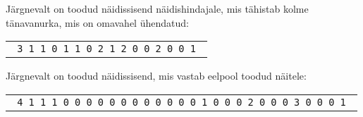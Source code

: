 \documentclass{boi2014}
\begin{document}
    Järgnevalt on toodud näidissisend näidishindajale, mis tähistab kolme tänavanurka, mis 
    on omavahel ühendatud:

    \begin{center}
        \begin{tabular}{p{4cm}}
            {\tt
                3 \newline
                0 1 1 \newline
                1 0 1 \newline
                1 1 0 \newline
                1 \newline
                0 2 1 2 \newline
                2 0 0 2 \newline
                1 0 0 1 \newline
            }
        \end{tabular}
    \end{center}

    Järgnevalt on toodud näidissisend, mis vastab eelpool toodud näitele:

    \begin{center}
        \begin{tabular}{p{4cm}}
            {\tt
                4 \newline
                0 1 1 1 \newline
                1 0 0 0 \newline
                1 0 0 0 \newline
                1 0 0 0 \newline
                1 \newline
                0 0 0 0 1 \newline
                2 0 0 0 2 \newline
                3 0 0 0 3 \newline
                1 0 0 0 1 \newline
            }
        \end{tabular}
    \end{center}
\end{document}
